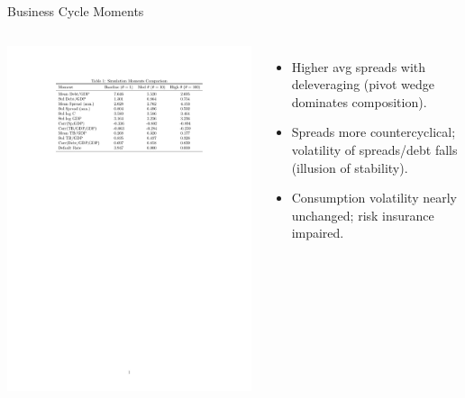 \documentclass[aspectratio=169,11pt,professionalfonts]{beamer}
\newcommand{\1}{\mathbb{1}}
\begin{document}
\begin{frame}{Business Cycle Moments}
  \begin{columns}[T,onlytextwidth]
    \includegraphics[width=\linewidth]{moments_comparison_table.pdf}
    \begin{itemize}
      \item Higher avg spreads with deleveraging (pivot wedge dominates composition).
      \item Spreads more countercyclical; volatility of spreads/debt falls (illusion of
            stability).
      \item Consumption volatility nearly unchanged; risk insurance impaired.
    \end{itemize}
  \end{columns}
\end{frame}
\end{document}
